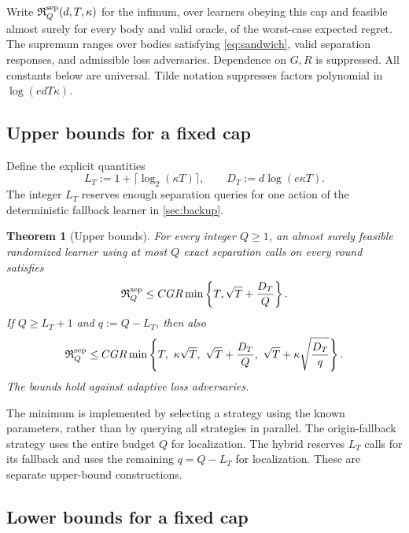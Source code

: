\documentclass[11pt]{article}
\newtheorem{theorem}{Theorem}[section]
\theoremstyle{definition}
\begin{document}
Write $\mathfrak R_Q^{\rm sep}(d,T,\kappa)$ for the infimum, over learners
obeying this cap and feasible almost surely for every body and valid oracle,
of the worst-case expected regret. The supremum ranges over bodies satisfying
\eqref{eq:sandwich}, valid separation responses, and admissible loss
adversaries. Dependence on $G,R$ is suppressed. All constants below are
universal. Tilde notation suppresses factors polynomial in
$\log(edT\kappa)$.

\subsection{Upper bounds for a fixed cap}

Define the explicit quantities
\begin{equation}\label{eq:LD}
 L_T:=1+\lceil\log_2(\kappa T)\rceil,
 \qquad D_T:=d\log(e\kappa T).
\end{equation}
The integer $L_T$ reserves enough separation queries for one action of the
deterministic fallback learner in \cref{sec:backup}.

\begin{theorem}[Upper bounds]\label{thm:upper}
For every integer $Q\ge1$, an almost surely feasible randomized learner using
at most $Q$ exact separation calls on every round satisfies
\begin{equation}\label{eq:upper-origin}
 \mathfrak R_Q^{\rm sep}
 \le C GR\min\left\{T,\sqrt T+\frac{D_T}{Q}\right\}.
\end{equation}
If $Q\ge L_T+1$ and $q:=Q-L_T$, then also
\begin{equation}\label{eq:upper-hybrid}
 \mathfrak R_Q^{\rm sep}
 \le C GR\min\left\{
 T,\ \kappa\sqrt T,\ \sqrt T+\frac{D_T}{Q},\
 \sqrt T+\kappa\sqrt{\frac{D_T}{q}}
 \right\}.
\end{equation}
The bounds hold against adaptive loss adversaries.
\end{theorem}

The minimum is implemented by selecting a strategy using the known
parameters, rather than by querying all strategies in parallel. The
origin-fallback strategy uses the entire budget $Q$ for localization.
The hybrid reserves $L_T$ calls for its fallback and uses the remaining
$q=Q-L_T$ for localization. These are separate upper-bound constructions.

\subsection{Lower bounds for a fixed cap}
\end{document}

